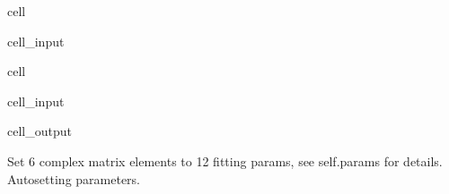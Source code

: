 \documentclass[letterpaper,table,10pt,english]{jupyterBook}
\begin{document}
\begin{sphinxuseclass}{cell}\begin{sphinxVerbatimInput}

\begin{sphinxuseclass}{cell_input}
\begin{sphinxVerbatim}[commandchars=\\\{\}]
\end{sphinxVerbatim}

\end{sphinxuseclass}\end{sphinxVerbatimInput}

\end{sphinxuseclass}
\begin{sphinxuseclass}{cell}\begin{sphinxVerbatimInput}

\begin{sphinxuseclass}{cell_input}
\begin{sphinxVerbatim}[commandchars=\\\{\}]
\PYG{p}{[}\PYG{p}{]}\PYG{p}{[}\PYG{p}{]}
\end{sphinxVerbatim}

\end{sphinxuseclass}\end{sphinxVerbatimInput}
\begin{sphinxVerbatimOutput}

\begin{sphinxuseclass}{cell_output}
\begin{sphinxVerbatim}[commandchars=\\\{\}]
Set 6 complex matrix elements to 12 fitting params, see self.params for details.
Auto\PYGZhy{}setting parameters.
\end{sphinxVerbatim}


\end{sphinxuseclass}
\end{sphinxVerbatimOutput}
\end{sphinxuseclass}
\end{document}
